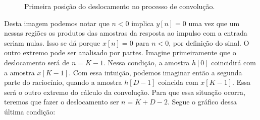 \documentclass[x11names,a4paper,12pt]{article}
\begin{document}
\begin{figure}[H]
  \centering
  \caption{Primeira posição do deslocamento no processo de convolução.}
  \label{fig:begin_convolution}
\end{figure}

Desta imagem podemos notar que $n<0$ implica $y[n]=0$ uma vez que um nessas regiões os produtos das amostras da resposta ao impulso com a entrada seriam nulas. Isso se dá porque $x[n]=0$ para $n<0$, por definição do sinal.
O outro extremo pode ser analisado por partes. Imagine primeiramente que o deslocamento será de $n=K-1$. Nessa condição, a amostra $h[0]$ coincidirá com a amostra $x[K-1]$. Com essa intuição, podemos imaginar então a segunda parte do raciocínio, quando a amostra $h[D-1]$ coincida com $x[K-1]$. Essa será o outro extremo do cálculo da convolução. Para que essa situação ocorra, teremos que fazer o deslocamento ser $n=K+D-2$. Segue o gráfico dessa última condição:
\end{document}

